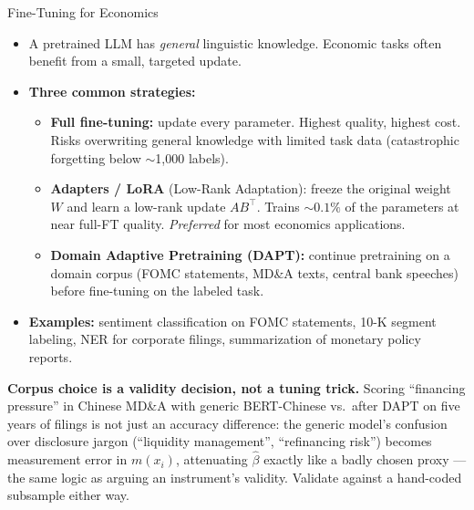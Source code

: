 \begin{frame}{Fine-Tuning for Economics}
\begin{itemize}
\item A pretrained LLM has \emph{general} linguistic knowledge. Economic tasks often benefit from a small, targeted update.

\medskip
\item \textbf{Three common strategies:}
\begin{itemize}
    \item \textbf{Full fine-tuning:} update every parameter. Highest quality, highest cost. Risks overwriting general knowledge with limited task data (catastrophic forgetting below $\sim$1{,}000 labels).
    \item \textbf{Adapters / LoRA} (Low-Rank Adaptation): freeze the original weight $W$ and learn a low-rank update $A B^{\top}$. Trains $\sim 0.1\%$ of the parameters at near full-FT quality. \emph{Preferred} for most economics applications.
    \item \textbf{Domain Adaptive Pretraining (DAPT):} continue pretraining on a domain corpus (FOMC statements, MD\&A texts, central bank speeches) before fine-tuning on the labeled task.
\end{itemize}

\medskip
\item \textbf{Examples:} sentiment classification on FOMC statements, 10-K segment labeling, NER for corporate filings, summarization of monetary policy reports.
\end{itemize}
\smallskip
\begin{cautionbox}
\textbf{Corpus choice is a validity decision, not a tuning trick.} Scoring ``financing pressure'' in Chinese MD\&A with generic BERT-Chinese vs.\ after DAPT on five years of filings is not just an accuracy difference: the generic model's confusion over disclosure jargon (``liquidity management'', ``refinancing risk'') becomes measurement error in $m(x_i)$, attenuating $\hat\beta$ exactly like a badly chosen proxy --- the same logic as arguing an instrument's validity. Validate against a hand-coded subsample either way.
\end{cautionbox}
\end{frame}

